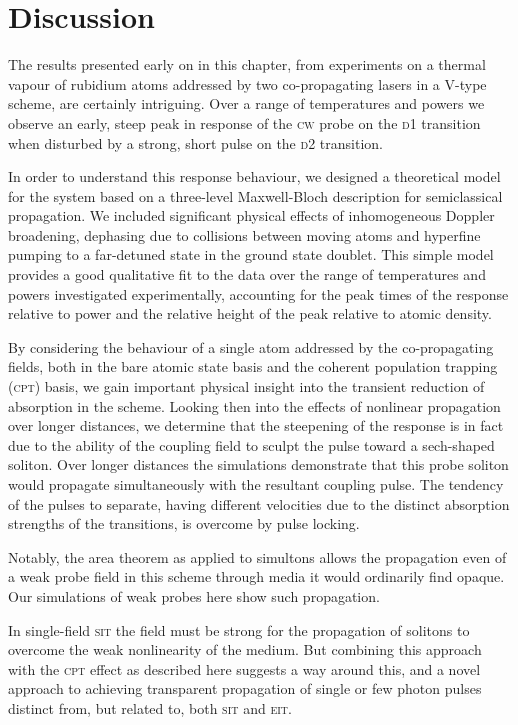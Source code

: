 \section{Discussion}
  \label{sec:simultons_discussion}

  The results presented early on in this chapter, from experiments on a thermal
  vapour of rubidium atoms addressed by two co-propagating lasers in a V-type
  scheme, are certainly intriguing. Over a range of temperatures and powers we
  observe an early, steep peak in response of the \textsc{cw} probe on the
  \textsc{d1} transition when disturbed by a strong, short pulse on the
  \textsc{d2} transition.

  In order to understand this response behaviour, we designed a theoretical
  model for the system based on a three-level Maxwell-Bloch description for
  semiclassical propagation. We included significant physical effects of
  inhomogeneous Doppler broadening, dephasing due to collisions between moving
  atoms and hyperfine pumping to a far-detuned state in the ground state
  doublet. This simple model provides a good qualitative fit to the data over
  the range of temperatures and powers investigated experimentally, accounting
  for the peak times of the response relative to power and the relative height
  of the peak relative to atomic density.

  By considering the behaviour of a single atom addressed by the co-propagating
  fields, both in the bare atomic state basis and the coherent population
  trapping (\textsc{cpt}) basis, we gain important physical insight into the
  transient reduction of absorption in the scheme. Looking then into the effects
  of nonlinear propagation over longer distances, we determine that the
  steepening of the response is in fact due to the ability of the coupling field
  to sculpt the pulse toward a sech-shaped soliton. Over longer distances the
  simulations demonstrate that this probe soliton would propagate simultaneously
  with the resultant coupling pulse. The tendency of the pulses to separate,
  having different velocities due to the distinct absorption strengths of the
  transitions, is overcome by pulse locking.

  Notably, the area theorem as applied to simultons allows the propagation even
  of a weak probe field in this scheme through media it would ordinarily find
  opaque. Our simulations of weak probes here show such propagation.

  In single-field \textsc{sit} the field must be strong for the propagation of
  solitons to overcome the weak nonlinearity of the medium. But combining this
  approach with the \textsc{cpt} effect as described here suggests a way around
  this, and a novel approach to achieving transparent propagation of single or
  few photon pulses distinct from, but related to, both \textsc{sit} and
  \textsc{eit}.

